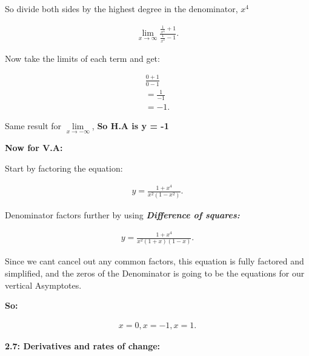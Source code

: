 \documentclass{report}
\begin{document}
        \bigbreak \noindent 
        So divide both sides by the highest degree in the denominator, \textbf{\textit{$x^4$}}
        
        \begin{align*}
            \lim\limits_{x \to \infty}{ \frac{\frac{1}{x^4} + 1}{ \frac{1}{x^2} - 1}} 
        .\end{align*}

        \bigbreak \noindent 
        Now take the limits of each term and get:

        \begin{align*}
           \frac{0 + 1}{0 - 1} \\
        = \frac{1}{-1} \\ 
        = -1
        .\end{align*}

        \bigbreak \noindent 
        Same result for $\lim\limits_{x \to - \infty}{}$, \textbf{So H.A is y = -1}

        \bigbreak \noindent \bigbreak \noindent 
        \textbf{Now for V.A:}

        \bigbreak \noindent 
        Start by factoring the equation:

        \begin{align*}
            y = \frac{1 + x^4}{x^2 \left(1 - x^2\right)}
        .\end{align*}

        \bigbreak \noindent 
        Denominator factors further by using \textbf{\textit{Difference of squares:}}

        \begin{align*}
            y = \frac{1 + x^4}{x^2 \left(1 + x\right) \left(1 - x\right)}
        .\end{align*}

        \bigbreak \noindent 
        Since we cant cancel out any common factors, this equation is fully factored and simplified,
        and the zeros of the Denominator is going to be the equations for our vertical Asymptotes.

        \bigbreak \noindent 
        \textbf{So:}

        \begin{align*}
            x = 0, x = -1, x = 1
        .\end{align*}

        \pagebreak \bigbreak \noindent
        \begin{Large}
            \textbf{2.7: Derivatives and rates of change:}
        \end{Large}
\end{document}
